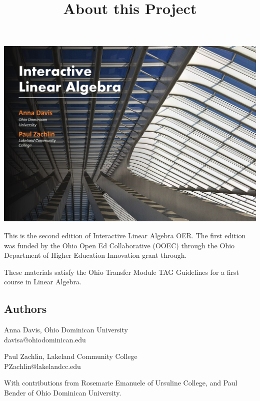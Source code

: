 \documentclass{ximera}
\title{About this Project} \license{CC-BY 4.0}
\begin{document}
\begin{abstract}
\end{abstract}
\maketitle

\begin{image}
\includegraphics{BookCover.jpg}
\end{image}

This is the second edition of Interactive Linear Algebra OER.  The first edition was funded by the Ohio Open Ed Collaborative (OOEC) through the Ohio Department of Higher Education Innovation grant through. 

These materials satisfy the Ohio Transfer Module TAG Guidelines for a first course in Linear Algebra.  

\subsection{Authors}
Anna Davis, Ohio Dominican University\\
davisa@ohiodominican.edu

Paul Zachlin, Lakeland Community College\\
PZachlin@lakelandcc.edu

With contributions from Rosemarie Emanuele of Ursuline College, and Paul Bender of Ohio Dominican University.

\end{document}
